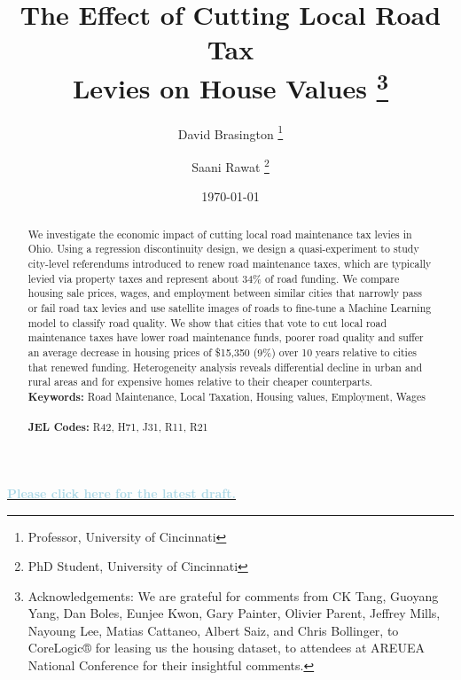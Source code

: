 \documentclass[12pt]{article}
\begin{document}
\begin{titlepage}
\title{The Effect of Cutting Local Road Tax \\ Levies on House Values
\thanks{Acknowledgements: We are grateful for comments from CK Tang, Guoyang Yang, Dan Boles, Eunjee Kwon, Gary Painter, Olivier Parent, Jeffrey Mills, Nayoung Lee, Matias Cattaneo, Albert Saiz, and Chris Bollinger, to CoreLogic® for leasing us the housing dataset, to attendees at AREUEA National Conference for their insightful comments.}}
\author{David Brasington \thanks{Professor, University of Cincinnati} \and Saani Rawat \thanks{PhD Student, University of Cincinnati}}
\date{\today}
\maketitle

\noindent
\begin{center}
\textbf{\href{https://example.com/latest-draft}{\textcolor{lightblue}{Please click here for the latest draft.}}}
\end{center}

\begin{abstract}
\noindent     We investigate the economic impact of cutting local road maintenance tax levies in Ohio. Using a regression discontinuity design, we design a quasi-experiment to study city-level referendums introduced to renew road maintenance taxes, which are typically levied via property taxes and represent about 34\% of road funding. We compare housing sale prices, wages, and employment between similar cities that narrowly pass or fail road tax levies and use satellite images of roads to fine-tune a Machine Learning model to classify road quality. We show that cities that vote to cut local road maintenance taxes have lower road maintenance funds, poorer road quality and suffer an average decrease in housing prices of \$15,350 (9\%) over 10 years relative to cities that renewed funding. Heterogeneity analysis reveals differential decline in urban and rural areas and for expensive homes relative to their cheaper counterparts.
\vspace{0in}\\
\noindent\textbf{Keywords:} Road Maintenance, Local Taxation, Housing values, Employment, Wages \\
\vspace{0in}\\
\noindent\textbf{JEL Codes:} R42, H71, J31, R11, R21 \\

\bigskip
\end{abstract}
\setcounter{page}{0}
\thispagestyle{empty}
\end{titlepage}
\pagebreak \newpage
\end{document}
